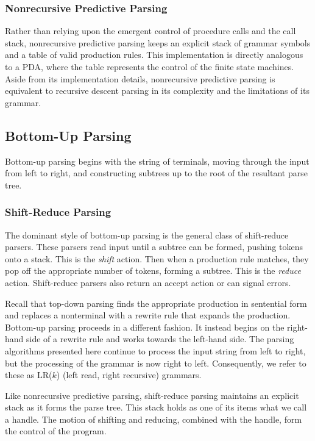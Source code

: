 \documentclass[a4paper, 10pt]{article}
\begin{document}
\subsubsection{Nonrecursive Predictive Parsing}
Rather than relying upon the emergent control of procedure calls and the call stack, nonrecursive predictive parsing keeps an explicit stack of grammar symbols and a table of valid production rules. This implementation is directly analogous to a PDA, where the table represents the control of the finite state machines. Aside from its implementation details, nonrecursive predictive parsing is equivalent to recursive descent parsing in its complexity and the limitations of its grammar.

\subsection{Bottom-Up Parsing}
Bottom-up parsing begins with the string of terminals, moving through the input from left to right, and constructing subtrees up to the root of the resultant parse tree.

\subsubsection{Shift-Reduce Parsing}\label{sec:shiftreduce}
The dominant style of bottom-up parsing is the general class of shift-reduce parsers. These parsers read input until a subtree can be formed, pushing tokens onto a stack. This is the \emph{shift} action. Then when a production rule matches, they pop off the appropriate number of tokens, forming a subtree. This is the \emph{reduce} action. Shift-reduce parsers also return an accept action or can signal errors.

Recall that top-down parsing finds the appropriate production in sentential form and replaces a nonterminal with a rewrite rule that expands the production. Bottom-up parsing proceeds in a different fashion. It instead begins on the right-hand side of a rewrite rule and works towards the left-hand side. The parsing algorithms presented here continue to process the input string from left to right, but the processing of the grammar is now right to left. Consequently, we refer to these as LR($k$) (left read, right recursive) grammars.

Like nonrecursive predictive parsing, shift-reduce parsing maintains an explicit stack as it forms the parse tree. This stack holds as one of its items what we call a handle. The motion of shifting and reducing, combined with the handle, form the control of the program.
\end{document}
